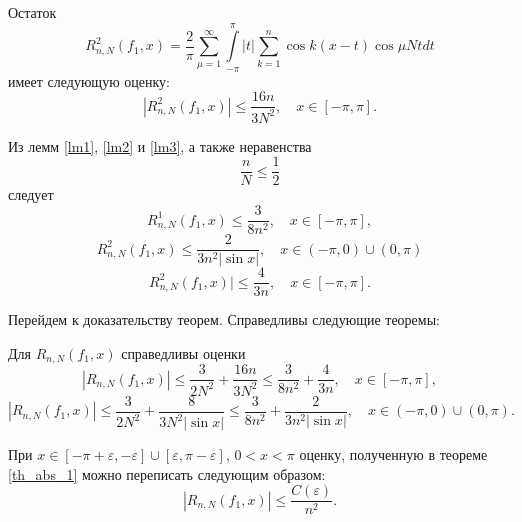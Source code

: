 \begin{lemma} \label{lm3}
  Остаток
  \begin{equation}
    R^2_{n,N}(f_1,x) = \frac{2}{\pi} \sum\limits_{\mu=1}^{\infty} \int\limits_{-\pi}^{\pi} |t| \sum\limits_{k=1}^{n} \cos k (x-t) \cos \mu N t dt
  \end{equation}
  имеет следующую оценку:
  \begin{equation}
    |R^2_{n,N}(f_1,x)| \leq \frac{16n}{3 N^2}, \quad x \in [-\pi, \pi].
  \end{equation}
\end{lemma}

\begin{corollary} \label{cor_abs_1}
  Из лемм \ref{lm1}, \ref{lm2} и \ref{lm3}, а также неравенства
  \begin{equation}
    \frac{n}{N} \leq \frac12
  \end{equation}
  следует
  \begin{equation}
    R^1_{n,N}(f_1,x) \leq \frac{3}{8n^2}, \quad x \in [-\pi, \pi],
  \end{equation}
  \begin{equation}
    R^2_{n,N}(f_1,x) \leq \frac{2}{3 n^2 |\sin x|}, \quad x \in (-\pi, 0) \cup (0, \pi)
  \end{equation}
  \begin{equation}
    R^2_{n,N}(f_1,x)| \leq \frac{4}{3n}, \quad x \in [-\pi, \pi].
  \end{equation}
\end{corollary}

Перейдем к доказательству теорем. Справедливы следующие теоремы:
\begin{theorem} \label{th_abs_1}
  Для $R_{n,N}(f_1,x)$ справедливы оценки
  \begin{equation}
    |R_{n,N}(f_1,x)| \leq \frac{3}{2N^2} + \frac{16n}{3N^2} \leq \frac{3}{8n^2} + \frac{4}{3n}, \quad x \in [-\pi, \pi],
  \end{equation}
  \begin{equation}
    |R_{n,N}(f_1,x)| \leq \frac{3}{2N^2} + \frac{8}{3 N^2|\sin x|} \leq \frac{3}{8n^2} + \frac{2}{3n^2|\sin x|}, \quad x \in (-\pi, 0) \cup (0, \pi).
  \end{equation}
\end{theorem}

\begin{corollary} \label{cor_abs_2}
  При $x \in [-\pi + \varepsilon,- \varepsilon] \cup [\varepsilon, \pi - \varepsilon]$, $0 < x < \pi$ оценку, полученную в теореме \ref{th_abs_1} можно переписать следующим образом:
  \begin{equation}
    |R_{n,N}(f_1,x)| \leq \frac{C(\varepsilon)}{n^2}.
  \end{equation}
\end{corollary}

